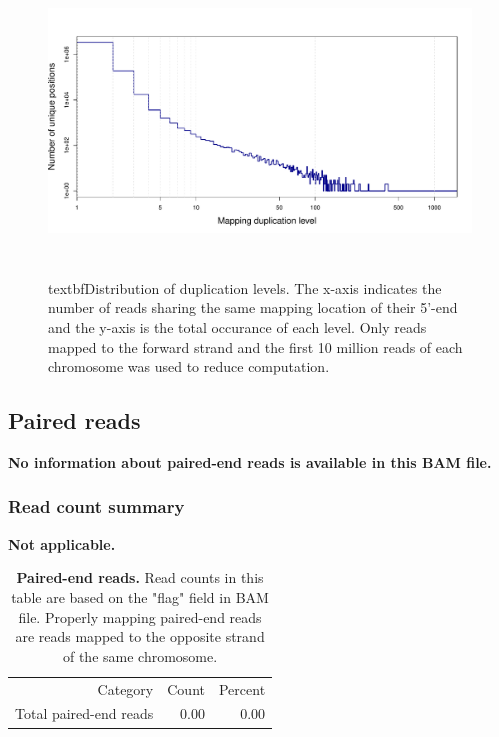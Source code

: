 \documentclass{article}
\begin{document}
\begin{center}
\begin{figure}[H]
\includegraphics[width=6in, height=3.2in]{bamchop-dup-distribution}
\caption{textbf{Distribution of duplication levels}. The x-axis indicates the number of reads sharing the same mapping location of their 5'-end and the y-axis is the total occurance of each level. Only reads mapped to the forward strand and the first 10 million reads of each chromosome was used to reduce computation.}
\end{figure}
\end{center}

\subsection{Paired reads}
\textbf{No information about paired-end reads is available in this BAM file.}

\subsubsection{Read count summary}
\textbf{Not applicable.}
\begin{table}
\begin{tabular}{|r|r|r|}
  \hline
Category & Count & Percent \\ 
  \rowcolor[gray]{0.9} \hline
Total paired-end reads & 0.00 & 0.00 \\ 
   \hline
\end{tabular}\caption{\textbf{Paired-end reads.} Read counts in this table are based on the "flag" field in BAM file. Properly mapping paired-end reads are reads mapped to the opposite strand of the same chromosome. }
\end{table}
\end{document}
